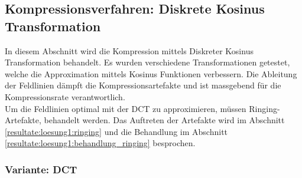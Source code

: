 \subsection{Kompressionsverfahren: Diskrete Kosinus Transformation} \label{resultate:loesung1}
In diesem Abschnitt wird die Kompression mittels Diskreter Kosinus Transformation behandelt. Es wurden verschiedene Transformationen getestet, welche die Approximation mittels Kosinus Funktionen verbessern. Die Ableitung der Feldlinien dämpft die Kompressionsartefakte und ist massgebend für die Kompressionsrate verantwortlich.\\
Um die Feldlinien optimal mit der DCT zu approximieren, müssen Ringing-Artefakte, behandelt werden. Das Auftreten der Artefakte wird im Abschnitt \ref{resultate:loesung1:ringing} und die Behandlung im Abschnitt \ref{resultate:loesung1:behandlung_ringing} besprochen.

\subsubsection{Variante: DCT}\label{resultate:dct}

